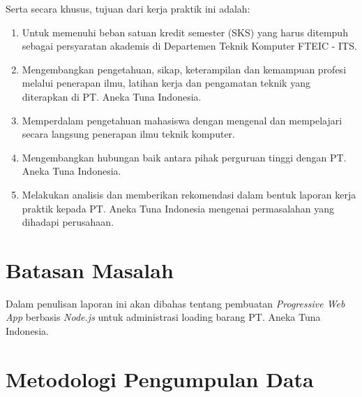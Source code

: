 Serta secara khusus, tujuan dari kerja praktik ini adalah:
\vspace{0.5ex}

\begin{enumerate}[nolistsep]

  \item Untuk memenuhi beban satuan kredit semester (SKS) yang harus ditempuh sebagai persyaratan akademis di Departemen Teknik Komputer FTEIC - ITS.
  \vspace{0.5ex}

  \item Mengembangkan pengetahuan, sikap, keterampilan dan kemampuan profesi melalui penerapan ilmu, latihan kerja dan pengamatan teknik yang diterapkan di PT. Aneka Tuna Indonesia.
  \vspace{0.5ex}

  \item Memperdalam pengetahuan mahasiswa dengan mengenal dan mempelajari secara langsung penerapan ilmu teknik komputer.
  \vspace{0.5ex}

  \item Mengembangkan hubungan baik antara pihak perguruan tinggi dengan PT. Aneka Tuna Indonesia.
  \vspace{0.5ex}

  \item Melakukan analisis dan memberikan rekomendasi dalam bentuk laporan kerja praktik kepada PT. Aneka Tuna Indonesia mengenai permasalahan yang dihadapi perusahaan.

\end{enumerate}
\vspace{0.5ex}

\section{Batasan Masalah}
\vspace{1ex}

Dalam penulisan laporan ini akan dibahas tentang pembuatan \emph{Progressive Web App} berbasis \emph{Node.js} untuk administrasi loading barang PT. Aneka Tuna Indonesia.
\vspace{0.5ex}

\section{Metodologi Pengumpulan Data}
\vspace{1ex}

